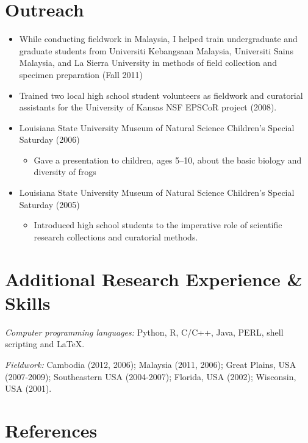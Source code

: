 \documentclass[10pt]{article}
\newenvironment{myItemize}{
  \begin{itemize}
    \setlength{\leftskip}{-4mm}
    \setlength{\itemsep}{0.25em}
    \setlength{\parskip}{0pt}
    \setlength{\parsep}{0.5em}}
  {\end{itemize}}
\newcommand{\myHangIndent}{\hangindent=5mm}
\begin{document}
\section*{Outreach}
\begin{myItemize}
\item While conducting fieldwork in Malaysia, I helped train undergraduate and
    graduate students from Universiti Kebangsaan Malaysia, Universiti Sains
    Malaysia, and La Sierra University in methods of field collection and
    specimen preparation (Fall 2011)
\item Trained two local high school student volunteers as fieldwork and
    curatorial assistants for the University of Kansas NSF EPSCoR project
    (2008).
\item Louisiana State University Museum of Natural Science Children's Special
    Saturday (2006)
    \begin{myItemize}
        \item Gave a presentation to children, ages 5--10, about the basic
            biology and diversity of frogs
    \end{myItemize}
\item Louisiana State University Museum of Natural Science Children's Special
    Saturday (2005)
    \begin{myItemize}
        \item Introduced high school students to the imperative role of
            scientific research collections and curatorial methods.
    \end{myItemize}
\end{myItemize}

\section*{Additional Research Experience \& Skills}
\myHangIndent
{\sffamily\itshape Computer programming languages:} Python, R, C/C++, Java,
PERL, shell scripting and \LaTeX.

\myHangIndent
{\sffamily\itshape Fieldwork:} Cambodia (2012, 2006); Malaysia (2011, 2006);
Great Plains, USA (2007-2009); Southeastern USA (2004-2007); Florida, USA
(2002); Wisconsin, USA (2001).

\section*{References}

\end{document}
